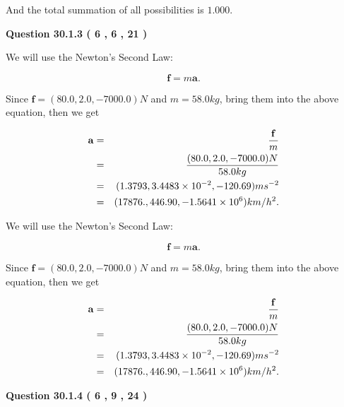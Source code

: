 \documentclass[12pt]{article}
\begin{document}
\noindent
 And the total summation of all possibilities is $  %
1.000 $.
 
 
 
  
\vspace{0.2in}
  
{\textbf{\Large{Question
30.1.3 
 (           6 ,           6 ,          21 )
}}}
  
  
 
 
\noindent{}

We will use the Newton's Second Law:
 
\[
\mathbf{f}=m\mathbf{a}.
\]
 
Since $\mathbf{f}=( %
80.0,  %
2.0,  %
-7000.0 )N$
and $m= %
58.0 kg$, bring them into the above equation, then we get
 
\begin{eqnarray*}
\mathbf{a}&=&\frac{\mathbf{f}}m  \\
&=&\frac{(
80.0 ,
2.0 ,
-7000.0 )N
}{ %
58.0 kg}  \\
&=&(
1.3793 ,
3.4483 \times 10^{-2},
-120.69
)ms^{-2} \\
&=&(
17876. ,
446.90 ,
-1.5641 \times 10^{6}
)km/h^2.
\end{eqnarray*}
 
 
 
 
 
\noindent{}

We will use the Newton's Second Law:
 
\[
\mathbf{f}=m\mathbf{a}.
\]
 
Since $\mathbf{f}=( %
80.0,  %
2.0,  %
-7000.0 )N$
and $m= %
58.0 kg$, bring them into the above equation, then we get
 
\begin{eqnarray*}
\mathbf{a}&=&\frac{\mathbf{f}}m  \\
&=&\frac{(
80.0 ,
2.0 ,
-7000.0 )N
}{ %
58.0 kg}  \\
&=&(
1.3793 ,
3.4483 \times 10^{-2},
-120.69
)ms^{-2} \\
&=&(
17876. ,
446.90 ,
-1.5641 \times 10^{6}
)km/h^2.
\end{eqnarray*}
 
 
 
  
\vspace{0.2in}
  
{\textbf{\Large{Question
30.1.4 
 (           6 ,           9 ,          24 )
}}}
  
\end{document}
